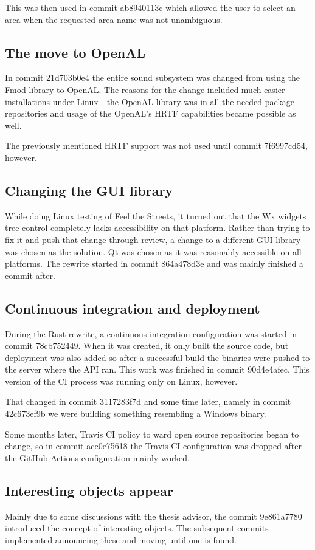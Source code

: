 \documentclass[nolof,digital]{fithesis3}
\begin{document}
This was then used in commit ab8940113c which allowed the user to select an area when the requested area name was not unambiguous.
\subsection{The move to OpenAL}
In commit 21d703b0e4 the entire sound subsystem was changed from using the Fmod library to OpenAL. The reasons for the change included much easier installations under Linux - the OpenAL library was in all the needed package repositories and usage of the OpenAL's HRTF capabilities became possible as well.

The previously mentioned HRTF support was not used until commit 7f6997cd54, however.
\subsection{Changing the GUI library}
While doing Linux testing of Feel the Streets, it turned out that the Wx widgets tree control completely lacks accessibility on that platform. Rather than trying to fix it and push that change through review, a change to a different GUI library was chosen as the solution. Qt was chosen as it was reasonably accessible on all platforms. The rewrite started in commit 864a478d3e and was mainly finished a commit after.
\subsection{Continuous integration and deployment}
During the Rust rewrite, a continuous integration configuration was started in commit 78cb752449. When it was created, it only built the source code, but deployment was also added so after a successful build the binaries were pushed to the server where the API ran. This work was finished in commit 90d4e4afec. This version of the CI process was running only on Linux, however.

That changed in commit 3117283f7d and some time later, namely in commit 42c673ef9b we were building something resembling a Windows binary.

Some months later, Travis CI policy to ward open source repositories began to change, so in commit acc0e75618 the Travis CI configuration was dropped after the GitHub Actions configuration mainly worked.
\subsection{Interesting objects appear}
Mainly due to some discussions with the thesis advisor, the commit 9e861a7780 introduced the concept of interesting objects. The subsequent commits implemented announcing these and moving until one is found.
\end{document}
